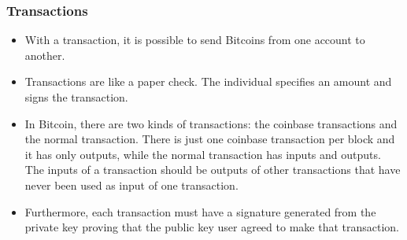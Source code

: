 \documentclass{beamer}
\begin{document}
\begin{frame}
   \frametitle{Transactions}
   \begin{itemize}
     \item With a transaction, it is possible to send Bitcoins from one account to another.
     \item Transactions are like a paper check. The individual specifies an amount and signs the transaction.
     \item In Bitcoin, there are two kinds of transactions:
       the coinbase transactions and the normal transaction.
       There is just one coinbase transaction per block and it has only outputs,
       while the normal transaction has inputs and outputs.
       The inputs of a transaction should be outputs of other transactions that have never been used as input of one transaction.
    \item Furthermore, each transaction must have a signature generated from the private key proving that the public key user agreed to make that transaction.
   \end{itemize}
\end{frame}
\end{document}
